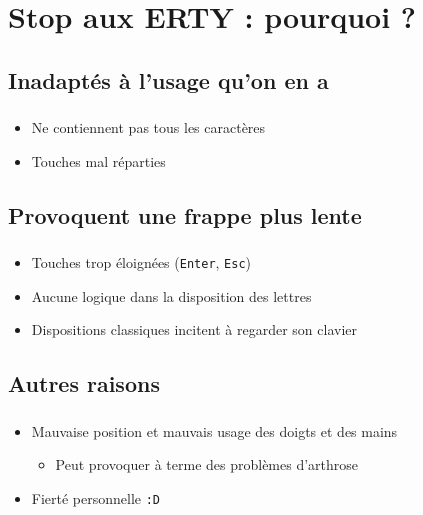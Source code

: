 \documentclass[c,12pt]{beamer}
\begin{document}
\section{Stop aux ERTY : pourquoi ?}
\subsection{Inadaptés à l'usage qu'on en a}

\begin{frame}
	\frametitle{\subsecname}
	\begin{itemize}
		\item<2->{Ne contiennent pas tous les caractères}
		\item<3->{Touches mal réparties}
	\end{itemize}
\end{frame}

\subsection{Provoquent une frappe plus lente}

\begin{frame}
	\frametitle{\subsecname}
	\begin{itemize}
		\item<1->{Touches trop éloignées (\texttt{Enter}, \texttt{Esc})}
		\item<2->{Aucune logique dans la disposition des lettres}
		\item<3->{Dispositions classiques incitent à regarder son clavier}
	\end{itemize}
\end{frame}

\subsection{Autres raisons}

\begin{frame}
	\frametitle{\subsecname}
	\begin{itemize}
		\item<1->{Mauvaise position et mauvais usage des doigts et des mains}
			\begin{itemize}
				\item{Peut provoquer à terme des problèmes d'arthrose}
			\end{itemize}
		\item<2->{Fierté personnelle \texttt{:D}}
	\end{itemize}
\end{frame}
\end{document}
